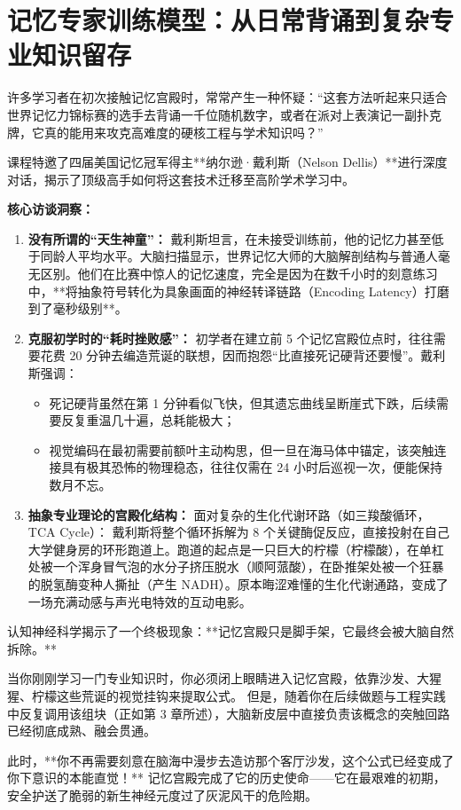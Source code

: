 \documentclass[12pt,a4paper,openany]{ctexbook}
\begin{document}
\section{记忆专家训练模型：从日常背诵到复杂专业知识留存}

许多学习者在初次接触记忆宫殿时，常常产生一种怀疑：“这套方法听起来只适合世界记忆力锦标赛的选手去背诵一千位随机数字，或者在派对上表演记一副扑克牌，它真的能用来攻克高难度的硬核工程与学术知识吗？”

课程特邀了四届美国记忆冠军得主**纳尔逊·戴利斯（Nelson Dellis）**进行深度对话，揭示了顶级高手如何将这套技术迁移至高阶学术学习中。

\begin{casebox}
\textbf{核心访谈洞察：}
\begin{enumerate}
    \item \textbf{没有所谓的“天生神童”：} 
    戴利斯坦言，在未接受训练前，他的记忆力甚至低于同龄人平均水平。大脑扫描显示，世界记忆大师的大脑解剖结构与普通人毫无区别。他们在比赛中惊人的记忆速度，完全是因为在数千小时的刻意练习中，**将抽象符号转化为具象画面的神经转译链路（Encoding Latency）打磨到了毫秒级别**。
    
    \item \textbf{克服初学时的“耗时挫败感”：} 
    初学者在建立前 5 个记忆宫殿位点时，往往需要花费 20 分钟去编造荒诞的联想，因而抱怨“比直接死记硬背还要慢”。戴利斯强调：
    \begin{itemize}
        \item 死记硬背虽然在第 1 分钟看似飞快，但其遗忘曲线呈断崖式下跌，后续需要反复重温几十遍，总耗能极大；
        \item 视觉编码在最初需要前额叶主动构思，但一旦在海马体中锚定，该突触连接具有极其恐怖的物理稳态，往往仅需在 24 小时后巡视一次，便能保持数月不忘。
    \end{itemize}
    
    \item \textbf{抽象专业理论的宫殿化结构：} 
    面对复杂的生化代谢环路（如三羧酸循环，TCA Cycle）：
    戴利斯将整个循环拆解为 8 个关键酶促反应，直接投射在自己大学健身房的环形跑道上。跑道的起点是一只巨大的柠檬（柠檬酸），在单杠处被一个浑身冒气泡的水分子挤压脱水（顺阿蒎酸），在卧推架处被一个狂暴的脱氢酶变种人撕扯（产生 NADH）。原本晦涩难懂的生化代谢通路，变成了一场充满动感与声光电特效的互动电影。
\end{enumerate}
\end{casebox}

\begin{extensionbox}
认知神经科学揭示了一个终极现象：**记忆宫殿只是脚手架，它最终会被大脑自然拆除。**

当你刚刚学习一门专业知识时，你必须闭上眼睛进入记忆宫殿，依靠沙发、大猩猩、柠檬这些荒诞的视觉挂钩来提取公式。
但是，随着你在后续做题与工程实践中反复调用该组块（正如第 3 章所述），大脑新皮层中直接负责该概念的突触回路已经彻底成熟、融会贯通。

此时，**你不再需要刻意在脑海中漫步去造访那个客厅沙发，这个公式已经变成了你下意识的本能直觉！** 记忆宫殿完成了它的历史使命——它在最艰难的初期，安全护送了脆弱的新生神经元度过了灰泥风干的危险期。
\end{extensionbox}
\end{document}
